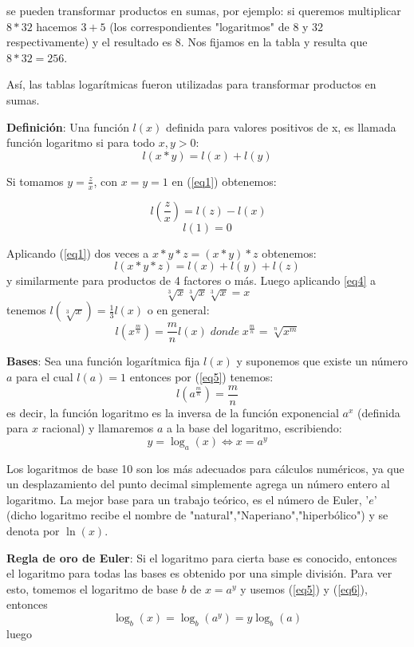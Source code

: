 \documentclass[a4paper,10pt,BCOR10mm,oneside,headsepline]{scrbook}
\newcounter{qr}
\begin{document}
se pueden transformar productos en sumas, por ejemplo: si queremos multiplicar $8*32$ hacemos $3+5$ (los correspondientes "logaritmos" de 8 y 32 respectivamente) y el resultado es $8$. Nos fijamos en la tabla y resulta que $8*32=256$.

Así, las tablas logarítmicas fueron utilizadas para transformar productos en sumas.

\textbf{Definición}: Una función $l(x)$ definida para valores positivos de x, es llamada función logaritmo si para todo $x,y>0$:
\begin{equation}
l(x*y)=l(x)+l(y)
\label{eq1}
\end{equation}

Si tomamos $y=\frac{z}{x}$, con $x=y=1$ en (\ref{eq1}) obtenemos:

\[\    l(\frac{z}{x})=l(z)-l(x)\]
\[  l(1)=0\]
    

Aplicando (\ref{eq1}) dos veces a $x*y*z=(x*y)*z$ obtenemos:
\begin{equation}
    l(x*y*z)=l(x)+l(y)+l(z)
    \label{eq4}
\end{equation}
y similarmente para productos de 4 factores o más.
Luego aplicando \ref{eq4} a
\[\sqrt[3]{x}\sqrt[3]{x}\sqrt[3]{x}=x\]
tenemos $l(\sqrt[3]{x})=\frac{1}{3}l(x)$ o en general:
\begin{equation}
    l(x^{\frac{m}{n}})=\frac{m}{n}l(x) \;donde \;x^{\frac{m}{n}}=\sqrt[n]{x^m}
    \label{eq5}
\end{equation}

\textbf{Bases}: Sea una función logarítmica fija $l(x)$ y suponemos que existe un número $a$ para el cual $l(a)=1$ entonces por (\ref{eq5}) tenemos:
\[  l(a^{\frac{m}{n}})=\frac{m}{n}\]
es decir, la función logaritmo es la inversa de la función exponencial $a^x$ (definida para $x$ racional) y llamaremos $a$ a la base del logaritmo, escribiendo:
\begin{equation}
    y=\log_{a}(x)\Leftrightarrow x=a^y
    \label{eq6}
\end{equation}

Los logaritmos de base 10 son los más adecuados para cálculos numéricos, ya que un desplazamiento del punto decimal simplemente agrega un número entero al logaritmo. La mejor base para un trabajo teórico, es el número de Euler, '$e$' \;(dicho logaritmo recibe el nombre de "natural","Naperiano","hiperbólico") y se denota por $\ln(x)$.

\textbf{Regla de oro de Euler}: Si el logaritmo para cierta base es conocido, entonces el logaritmo para todas las bases es obtenido por una simple división. Para ver esto, tomemos el logaritmo de base $b$ de $x=a^y$ y usemos (\ref{eq5}) y (\ref{eq6}), entonces
\[
    \log_{b}(x)=\log_{b}(a^y)=y\log_{b}(a)\]
luego
    
\end{document}
